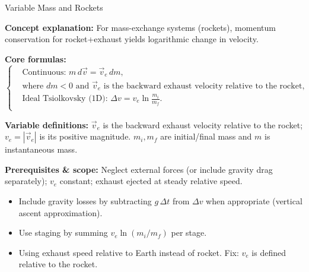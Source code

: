 \begin{KnowledgePoint}{Variable Mass and Rockets \Extension}
  \KPFormulas
\begin{formulabox}
  \textbf{Concept explanation:} For mass-exchange systems (rockets), momentum conservation for rocket+exhaust yields logarithmic change in velocity.
  
  \textbf{Core formulas:}
  \[
  \left\{\begin{aligned}
    &\text{Continuous: } m\,d\vec v=\vec v_e\,dm,\\
    &\text{where } dm<0\text{ and }\vec v_e\text{ is the backward exhaust velocity relative to the rocket},\\
    &\text{Ideal Tsiolkovsky (1D): } \Delta v=v_e\ln\frac{m_i}{m_f}.\\
  \end{aligned}\right.
  \]
  
  \textbf{Variable definitions:} $\vec v_e$ is the backward exhaust velocity relative to the rocket; $v_e=|\vec v_e|$ is its positive magnitude. $m_i,m_f$ are initial/final mass and $m$ is instantaneous mass.
  
  
  
  \textbf{Prerequisites \& scope:} Neglect external forces (or include gravity drag separately); $v_e$ constant; exhaust ejected at steady relative speed.
\end{formulabox}

  \KPHeuristics
  \begin{heuristicsbox}
  \begin{itemize}[leftmargin=*]
    \item Include gravity losses by subtracting $g\,\Delta t$ from $\Delta v$ when appropriate (vertical ascent approximation).
    \item Use staging by summing $v_e\ln(m_i/m_f)$ per stage.
  \end{itemize}
  \vspace{0.4em}
  \begin{itemize}[leftmargin=*]
    \item Using exhaust speed relative to Earth instead of rocket. Fix: $v_e$ is defined relative to the rocket.
  \end{itemize}
  \end{heuristicsbox}


\end{KnowledgePoint}

